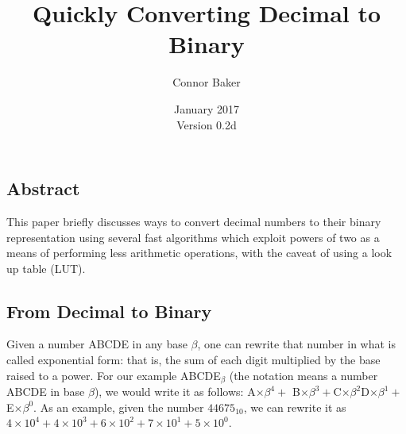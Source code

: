 \documentclass[12pt]{article}
\begin{document}

\null
\nointerlineskip
\vfill
\let \snewpage \newpage
\let \newpage \relax
\title{Quickly Converting Decimal to Binary}
\author{Connor Baker}
\date{January 2017\\Version 0.2d}
\maketitle

\begin{center}
  \subsection*{Abstract}
\end{center}
This paper briefly discusses ways to convert decimal numbers to their binary representation using several fast algorithms which exploit powers of two as a means of performing less arithmetic operations, with the caveat of using a look up table (LUT).

\let \newpage \snewpage
\vfill
\thispagestyle{empty}


\newpage %



\makeatletter
{}
\makeatother
\tableofcontents

\clearpage
{}



\newpage %



\begin{center}
  \section{From Decimal to Binary}
\end{center}
Given a number ABCDE in any base $\beta$, one can rewrite that number in what is called exponential form: that is, the sum of each digit multiplied by the base raised to a power. For our example ABCDE$_{\beta}$ (the notation means a number ABCDE in base $\beta$), we would write it as follows: A$\times\beta^4 +$ B$\times\beta^3 + $C$\times\beta^2 $D$\times\beta^1 + $E$\times\beta^0$. As an example, given the number $44675_{10}$, we can rewrite it as $4\times10^4 + 4\times10^3 + 6\times10^2 + 7\times10^1 + 5\times10^0$.
\end{document}
